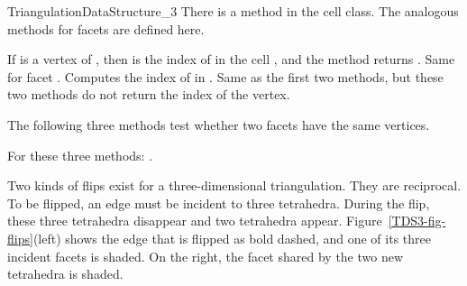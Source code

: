 \begin{ccRefConcept}{TriangulationDataStructure_3}
There is a method  in the cell class. The analogous
methods for facets are defined here.

{If  is a vertex of , then  is the index of
 in the cell , and the method returns .
}
\ccGlue
{}
{Same for facet . Computes the index  of  in
.}
\ccGlue
{}
{}
\ccGlue
{}
{Same as the first two methods, but these two methods do not return the
index of the vertex.}

The following three methods test whether two facets have the same
vertices.

{}
\ccGlue
{}
{}
\ccGlue
{}
{For these three methods: .}


Two kinds of flips exist for a three-dimensional triangulation. They
are reciprocal. To be flipped, an edge must be incident to three
tetrahedra. During the flip, these three tetrahedra disappear and two
tetrahedra appear. Figure~\ref{TDS3-fig-flips}(left) shows the
edge that is flipped as bold dashed, and one of its three incident
facets is shaded. On the right, the facet shared by the two new
tetrahedra is shaded. 



\end{ccRefConcept}
